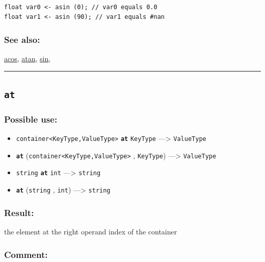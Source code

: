 \documentclass[]{book}
\providecommand{\tightlist}{%
  \setlength{\itemsep}{0pt}\setlength{\parskip}{0pt}}
\theoremstyle{definition}
\theoremstyle{definition}
\theoremstyle{definition}
\theoremstyle{remark}
\begin{document}
\begin{verbatim}
 
float var0 <- asin (0); // var0 equals 0.0 
float var1 <- asin (90); // var1 equals #nan
\end{verbatim}

\subsubsection{See also:}\label{see-also-38}

\href{operators-a-to-a.html\#acos}{acos},
\href{operators-a-to-a.html\#atan}{atan},
\href{operators-s-to-z.html\#sin}{sin},

\begin{center}\rule{0.5\linewidth}{\linethickness}\end{center}

\subsection{\texorpdfstring{\texttt{at}}{at}}\label{at}

\subsubsection{Possible use:}\label{possible-use-56}

\begin{itemize}
\tightlist
\item
  \texttt{container\textless{}KeyType,ValueType\textgreater{}}
  \textbf{\texttt{at}} \texttt{KeyType} ---\textgreater{}
  \texttt{ValueType}
\item
  \textbf{\texttt{at}}
  (\texttt{container\textless{}KeyType,ValueType\textgreater{}} ,
  \texttt{KeyType}) ---\textgreater{} \texttt{ValueType}
\item
  \texttt{string} \textbf{\texttt{at}} \texttt{int} ---\textgreater{}
  \texttt{string}
\item
  \textbf{\texttt{at}} (\texttt{string} , \texttt{int})
  ---\textgreater{} \texttt{string}
\end{itemize}

\subsubsection{Result:}\label{result-55}

the element at the right operand index of the container

\subsubsection{Comment:}\label{comment-13}
\end{document}
